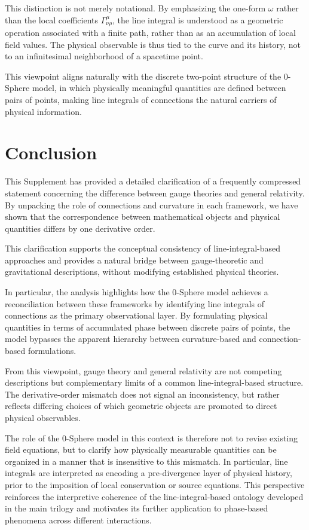 \documentclass[12pt,letterpaper]{article}
\begin{document}
This distinction is not merely notational. By emphasizing the one-form $\omega$ rather than the local coefficients $\Gamma^\mu_{\nu\rho}$, the line integral is understood as a geometric operation associated with a finite path, rather than as an accumulation of local field values. The physical observable is thus tied to the curve and its history, not to an infinitesimal neighborhood of a spacetime point.

This viewpoint aligns naturally with the discrete two-point structure of the 0-Sphere model, in which physically meaningful quantities are defined between pairs of points, making line integrals of connections the natural carriers of physical information.

\section{Conclusion}

\justifying
This Supplement has provided a detailed clarification of a frequently compressed statement concerning the difference between gauge theories and general relativity. By unpacking the role of connections and curvature in each framework, we have shown that the correspondence between mathematical objects and physical quantities differs by one derivative order.

This clarification supports the conceptual consistency of line-integral-based approaches and provides a natural bridge between gauge-theoretic and gravitational descriptions, without modifying established physical theories.

In particular, the analysis highlights how the 0-Sphere model achieves a reconciliation between these frameworks by identifying line integrals of connections as the primary observational layer. By formulating physical quantities in terms of accumulated phase between discrete pairs of points, the model bypasses the apparent hierarchy between curvature-based and connection-based formulations.

From this viewpoint, gauge theory and general relativity are not competing descriptions but complementary limits of a common line-integral-based structure. The derivative-order mismatch does not signal an inconsistency, but rather reflects differing choices of which geometric objects are promoted to direct physical observables.

The role of the 0-Sphere model in this context is therefore not to revise existing field equations, but to clarify how physically measurable quantities can be organized in a manner that is insensitive to this mismatch. In particular, line integrals are interpreted as encoding a pre-divergence layer of physical history, prior to the imposition of local conservation or source equations. This perspective reinforces the interpretive coherence of the line-integral-based ontology developed in the main trilogy and motivates its further application to phase-based phenomena across different interactions.
\end{document}
